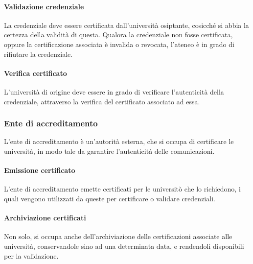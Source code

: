 \documentclass[a4paper,12pt]{article}
\begin{document}
\paragraph{Validazione credenziale} La credenziale deve essere certificata dall'università osiptante, cosicché si abbia la certezza della validità di questa. Qualora la credenziale non fosse certificata, oppure la certificazione associata è invalida o revocata, l'ateneo è in grado di rifiutare la credenziale.
\paragraph{Verifica certificato} L'università di origine deve essere in grado di verificare l'autenticità della credenziale, attraverso la verifica del certificato associato ad essa.

\subsubsection{Ente di accreditamento}
L'ente di accreditamento è un'autorità esterna, che si occupa di certificare le università, in modo tale da garantire l'autenticità delle comunicazioni. 
\paragraph{Emissione certificato} L'ente di accreditamento emette certificati per le universitò che lo richiedono, i quali vengono utilizzati da queste per certificare o validare credenziali.
\paragraph{Archiviazione certificati} Non solo, si occupa anche dell'archiviazione delle certificazioni associate alle università, conservandole sino ad una determinata data, e rendendoli disponibili per la validazione.
\end{document}
